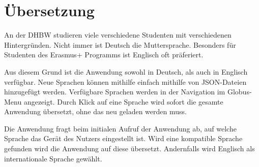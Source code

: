 




\section{Übersetzung}

An der DHBW studieren viele verschiedene Studenten mit verschiedenen Hintergründen.
Nicht immer ist Deutsch die Muttersprache.
Besonders für Studenten des Erasmus+ Programms ist Englisch oft präferiert.

Aus diesem Grund ist die Anwendung sowohl in Deutsch, als auch in Englisch verfügbar.
Neue Sprachen können mithilfe einfach mithilfe von JSON-Dateien hinzugefügt werden.
Verfügbare Sprachen werden in der Navigation im Globus-Menu angezeigt.
Durch Klick auf eine Sprache wird sofort die gesamte Anwendung übersetzt, ohne das neu geladen werden muss.

Die Anwendung fragt beim initialen Aufruf der Anwendung ab, auf welche Sprache das Gerät des Nutzers eingestellt ist.
Wird eine kompatible Sprache gefunden wird die Anwendung auf diese übersetzt.
Andernfalls wird Englisch als internationale Sprache gewählt.



